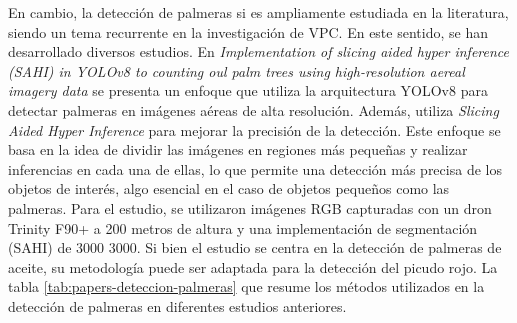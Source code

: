 
En cambio, la detección de palmeras si es ampliamente estudiada en la literatura, siendo un tema recurrente en la investigación de VPC. En este sentido, se han desarrollado diversos estudios. En \textit{Implementation of slicing aided hyper inference (SAHI) in YOLOv8 to counting oul palm trees using high-resolution aereal imagery data} \citep{zhorif_implementation_2024} se presenta un enfoque que utiliza la arquitectura YOLOv8 para detectar palmeras en imágenes aéreas de alta resolución. Además, utiliza \textit{Slicing Aided Hyper Inference} para mejorar la precisión de la detección. Este enfoque se basa en la idea de dividir las imágenes en regiones más pequeñas y realizar inferencias en cada una de ellas, lo que permite una detección más precisa de los objetos de interés, algo esencial en el caso de objetos pequeños como las palmeras. Para el estudio, se utilizaron imágenes RGB capturadas con un dron Trinity F90+ a 200 metros de altura y una implementación de segmentación (SAHI) de \SI{3000}{}\,\texttimes\,\SI{3000}{\pixel}. Si bien el estudio se centra en la detección de palmeras de aceite, su metodología puede ser adaptada para la detección del picudo rojo. La tabla \ref{tab:papers-deteccion-palmeras} que resume los métodos utilizados en la detección de palmeras en diferentes estudios anteriores.

